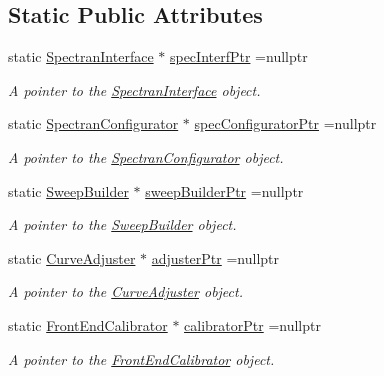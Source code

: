 \subsection*{Static Public Attributes}
\begin{DoxyCompactItemize}
\item 
static \hyperlink{classSpectranInterface}{Spectran\+Interface} $\ast$ \hyperlink{classSignalHandler_a855d0b79fcbacf50e4a1d12bd5d1bf53}{spec\+Interf\+Ptr} =nullptr
\begin{DoxyCompactList}\small\item\em A pointer to the {\itshape \hyperlink{classSpectranInterface}{Spectran\+Interface}} object. \end{DoxyCompactList}\item 
static \hyperlink{classSpectranConfigurator}{Spectran\+Configurator} $\ast$ \hyperlink{classSignalHandler_a0b9c75b3e3c928c01cc5e44d42e5ac38}{spec\+Configurator\+Ptr} =nullptr
\begin{DoxyCompactList}\small\item\em A pointer to the {\itshape \hyperlink{classSpectranConfigurator}{Spectran\+Configurator}} object. \end{DoxyCompactList}\item 
static \hyperlink{classSweepBuilder}{Sweep\+Builder} $\ast$ \hyperlink{classSignalHandler_a23ec28699521fb435a5eb90f2c36bccb}{sweep\+Builder\+Ptr} =nullptr
\begin{DoxyCompactList}\small\item\em A pointer to the {\itshape \hyperlink{classSweepBuilder}{Sweep\+Builder}} object. \end{DoxyCompactList}\item 
static \hyperlink{classCurveAdjuster}{Curve\+Adjuster} $\ast$ \hyperlink{classSignalHandler_ab3328bb82a0e67153d8ff39bf04c7196}{adjuster\+Ptr} =nullptr
\begin{DoxyCompactList}\small\item\em A pointer to the {\itshape \hyperlink{classCurveAdjuster}{Curve\+Adjuster}} object. \end{DoxyCompactList}\item 
static \hyperlink{classFrontEndCalibrator}{Front\+End\+Calibrator} $\ast$ \hyperlink{classSignalHandler_ae5bbe309adfefeb3b7e9ebf31d32b763}{calibrator\+Ptr} =nullptr
\begin{DoxyCompactList}\small\item\em A pointer to the {\itshape \hyperlink{classFrontEndCalibrator}{Front\+End\+Calibrator}} object. \end{DoxyCompactList}\item 

\end{DoxyCompactItemize}
